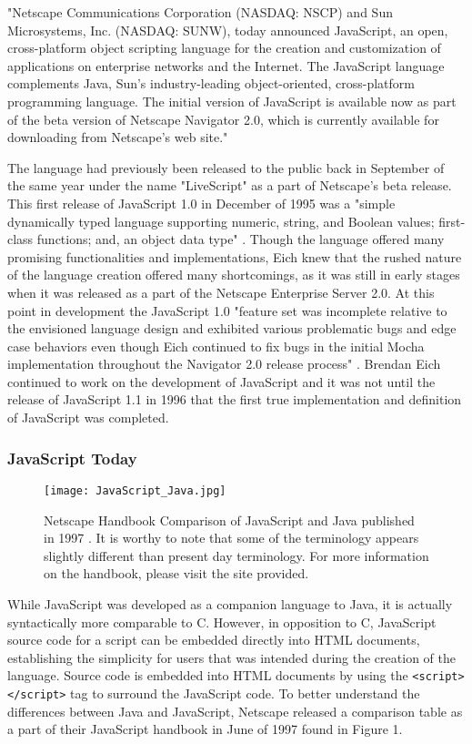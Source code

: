 \documentclass{article}
\theoremstyle{theorem}
\theoremstyle{definition}
\theoremstyle{remark}
\begin{document}
"Netscape Communications Corporation (NASDAQ: NSCP) and Sun Microsystems, Inc. (NASDAQ: SUNW), today announced JavaScript, an open, cross-platform object scripting language for the creation and customization of applications on enterprise networks and the Internet. The JavaScript language complements Java, Sun's industry-leading object-oriented, cross-platform programming language. The initial version of JavaScript is available now as part of the beta version of Netscape Navigator 2.0, which is currently available for downloading from Netscape's web site." \cite{5}

The language had previously been released to the public back in September of the same year under the name "LiveScript" as a part of Netscape's beta release. This first release of JavaScript 1.0 in December of 1995 was a "simple dynamically typed language supporting numeric, string, and Boolean values; first-class functions; and, an object data type" \cite{1}. Though the language offered many promising functionalities and implementations, Eich knew that the rushed nature of the language creation offered many shortcomings, as it was still in early stages when it was released as a part of the Netscape Enterprise Server 2.0. At this point in development the JavaScript 1.0 "feature set was incomplete relative to the envisioned language design and exhibited various problematic bugs and edge case behaviors even though Eich continued to fix bugs in the initial Mocha implementation throughout the Navigator 2.0 release process" \cite{1}. Brendan Eich continued to work on the development of JavaScript and it was not until the release of JavaScript 1.1 in 1996 that the first true implementation and definition of JavaScript was completed.


\subsubsection{JavaScript Today}

\begin{figure}
\centering
\texttt{[image: JavaScript\_Java.jpg]}
\caption{\label{fig:JavaScript_Java}Netscape Handbook Comparison of JavaScript and Java published in 1997 \cite{6}. It is worthy to note that some of the terminology appears slightly different than present day terminology. For more information on the handbook, please visit the site provided.}
\end{figure}

While JavaScript was developed as a companion language to Java, it is actually syntactically more comparable to C. However, in opposition to C, JavaScript source code for a script can be embedded directly into HTML documents, establishing the simplicity for users that was intended during the creation of the language. Source code is embedded into HTML documents by using the \lstinline{<script></script>} tag to surround the JavaScript code. To better understand the differences between Java and JavaScript, Netscape released a comparison table as a part of their JavaScript handbook in June of 1997 \cite{6} found in Figure 1.
\end{document}
